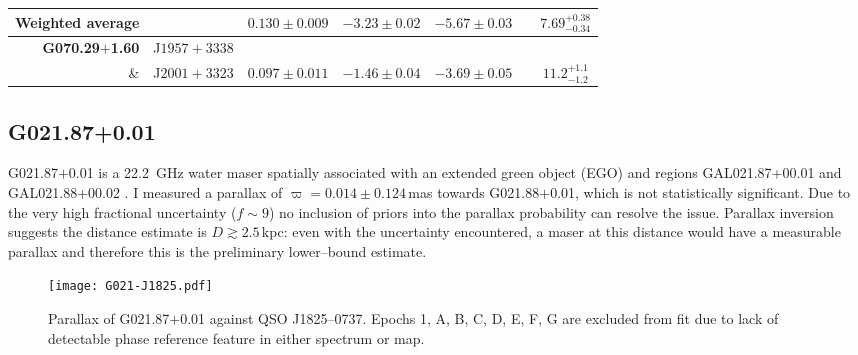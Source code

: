 \begin{table}[h]
\begin{tabular}{rrccccc}
	        		Weighted average&           &  $0.130\pm0.009$ & $-3.23 \pm0.02$  & $-5.67 \pm0.03$  &  & $7.69^{+0.38}_{-0.34}$ \\\hline
	        		\textbf{G070.29$+$1.60}   &J$1957+3338$&  &  &  &  \\ \& & J$2001+3323$ & $0.097\pm0.011$ & $-1.46\pm0.04$ & $-3.69\pm0.05$ &  & $11.2^{+1.1}_{-1.2}$ \\\bottomrule
	        	\end{tabular}
	        \end{table}
                
        \subsection{G021.87+0.01}
            G021.87$+$0.01 is a 22.2~GHz water maser spatially associated with an extended green object (EGO) and \hii\space regions GAL021.87+00.01 and GAL021.88+00.02 \citep[][ respectively]{Rodgers1960,Wink1982}.
            I measured a parallax of $\varpi=0.014\pm0.124$\,mas towards G021.88$+$0.01, which is not statistically significant. Due to the very high fractional uncertainty ($f\sim9$) no inclusion of priors into the parallax probability can resolve the issue. Parallax inversion suggests the  distance estimate is $D\gtrsim2.5$\,kpc: even with the uncertainty encountered, a maser at this distance would have a measurable parallax and therefore this is the preliminary lower--bound estimate. 
				        
			\begin{figure}[h]
				\centering
				\texttt{[image: G021-J1825.pdf]}
				\caption[G021.87+0.01 Parallax Fit]{Parallax of G021.87$+$0.01 against QSO J1825--0737. Epochs 1, A, B, C, D, E, F, G are excluded from fit due to lack of detectable phase reference feature in either spectrum or map.}
				\label{fig:per_g021parallax}
			\end{figure}	        
				        
